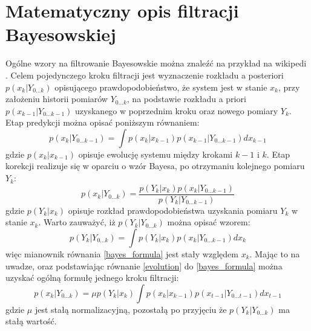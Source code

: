\section{Matematyczny opis filtracji Bayesowskiej}
Ogólne wzory na filtrowanie Bayesowskie można znaleźć na przykład na wikipedi \cite{wiki_bayes_filter}. Celem pojedynczego kroku filtracji jest wyznaczenie rozkładu a posteriori $p(x_{k}|Y_{0...k})$ opisującego prawdopodobieństwo, że system jest w stanie $x_k$, przy założeniu historii pomiarów $Y_{0...k}$, na podstawie rozkładu a priori $p(x_{k-1}|Y_{0...k-1})$ uzyskanego w poprzednim kroku oraz nowego pomiary $Y_k$. Etap predykcji można opisać poniższym równaniem:
\begin{equation} \label{evolution}
	p(x_k|Y_{0...k-1})=\int p(x_k|x_{k-1})p(x_{k-1}|Y_{0...k-1}) dx_{k-1}
\end{equation}
gdzie $p(x_k|x_{k-1})$ opisuje ewolucję systemu między krokami $k-1$ i $k$. Etap korekcji realizuje się w oparciu o wzór Bayesa, po otrzymaniu kolejnego pomiaru $Y_k$:
\begin{equation}\label{bayes_formula}
	p(x_k|Y_{0...k})=\frac{p(Y_k|x_k)p(x_k|Y_{0...k-1})}{p(Y_k|Y_{0...k-1})}
\end{equation}
gdzie $p(Y_k|x_k)$ opisuje rozkład prawdopodobieństwa uzyskania pomiaru $Y_k$ w stanie $x_k$. Warto zauważyć, iż $p(Y_k|Y_{0...k})$ można opisać wzorem:
\begin{equation}
p(Y_k|Y_{0...k})=\int p(Y_k|x_k)p(x_k|Y_{0...k-1}) dx_k
\end{equation}
więc mianownik równania \ref{bayes_formula} jest stały względem $x_k$. Mając to na uwadze, oraz podstawiając równanie \ref{evolution} do \ref{bayes_formula} można uzyskać ogólną formułę jednego kroku filtracji:
\begin{equation}
	p(x_k|Y_{0...k})=\mu p(Y_k|x_k)\int p(x_k|x_{k-1})p(x_{t-1}|Y_{0...t-1}) dx_{t-1}
\end{equation}
gdzie $\mu$ jest stałą normalizacyjną, pozostałą po przyjęciu że $p(Y_k|Y_{0...k})$ ma stałą wartość.
